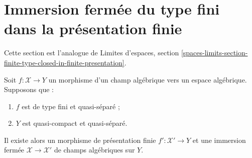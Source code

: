 \section{Immersion fermée du type fini dans la présentation finie}
\label{section-finite-type-closed-in-finite-presentation}

\noindent
Cette section est l'analogue de Limites d'espaces, section
\ref{spaces-limits-section-finite-type-closed-in-finite-presentation}.

\begin{lemma}
\label{lemma-finite-type-closed-in-finite-presentation}
Soit $f : \mathcal{X} \to Y$ un morphisme d'un champ algébrique vers un espace
algébrique. Supposons que :
\begin{enumerate}
\item $f$ est de type fini et quasi-séparé ;
\item $Y$ est quasi-compact et quasi-séparé.
\end{enumerate}
Il existe alors un morphisme de présentation finie
$f' : \mathcal{X}' \to Y$ et une immersion fermée
$\mathcal{X} \to \mathcal{X}'$ de champs algébriques sur $Y$.
\end{lemma}


